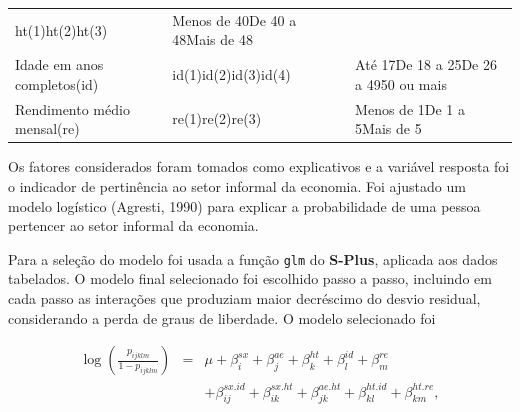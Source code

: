 \documentclass[]{book}
\theoremstyle{definition}
\theoremstyle{definition}
\theoremstyle{definition}
\theoremstyle{remark}
\begin{document}
\begin{longtable}[]{@{}lll@{}}
\begin{minipage}[t]{0.10\columnwidth}
ht(1)ht(2)ht(3)\strut
\end{minipage} & \begin{minipage}[t]{0.25\columnwidth}\raggedright\strut
Menos de 40De 40 a 48Mais de 48\strut
\end{minipage}\tabularnewline
\begin{minipage}[t]{0.38\columnwidth}\raggedright\strut
Idade em anos completos(id)\strut
\end{minipage} & \begin{minipage}[t]{0.10\columnwidth}\raggedright\strut
id(1)id(2)id(3)id(4)\strut
\end{minipage} & \begin{minipage}[t]{0.25\columnwidth}\raggedright\strut
Até 17De 18 a 25De 26 a 4950 ou mais\strut
\end{minipage}\tabularnewline
\begin{minipage}[t]{0.38\columnwidth}\raggedright\strut
Rendimento médio mensal(re)\strut
\end{minipage} & \begin{minipage}[t]{0.10\columnwidth}\raggedright\strut
re(1)re(2)re(3)\strut
\end{minipage} & \begin{minipage}[t]{0.25\columnwidth}\raggedright\strut
Menos de 1De 1 a 5Mais de 5\strut
\end{minipage}\tabularnewline
\bottomrule
\end{longtable}

Os fatores considerados foram tomados como explicativos e a variável
resposta foi o indicador de pertinência ao setor informal da economia.
Foi ajustado um modelo logístico (Agresti, 1990) para explicar a
probabilidade de uma pessoa pertencer ao setor informal da economia.

Para a seleção do modelo foi usada a função \texttt{glm} do
\textbf{S-Plus}, aplicada aos dados tabelados. O modelo final
selecionado foi escolhido passo a passo, incluindo em cada passo as
interações que produziam maior decréscimo do desvio residual,
considerando a perda de graus de liberdade. O modelo selecionado foi

\begin{eqnarray}
\log \left( \frac{p_{ijklm}}{1-p_{ijklm}}\right) &=&\mu +\beta
_{i}^{sx}+\beta _{j}^{ae}+\beta _{k}^{ht}+\beta _{l}^{id}+\beta _{m}^{re}
\label{eq:norm28} \\
&&+\beta _{ij}^{sx.id}+\beta _{ik}^{sx.ht}+\beta _{jk}^{ae.ht}+\beta
_{kl}^{ht.id}+\beta _{km}^{ht.re},  \nonumber
\end{eqnarray}
\end{document}
